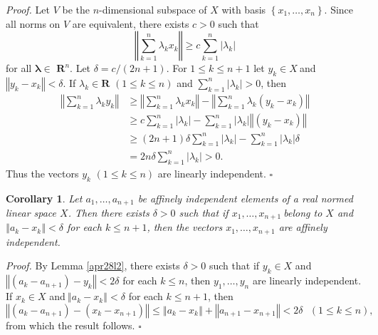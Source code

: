 \documentclass[11pt]{article}%
\newtheorem{corollary}[theorem]{Corollary}
\newenvironment{proof}[1][Proof]{\noindent\textit{#1.} }{}
\begin{document}
\begin{proof}
Let $V$ be the $n$-dimensional subspace of $X$ with basis $\left\{
x_{1},\ldots,x_{n}\right\}  $. Since all norms on $V$ are equivalent, there
exists $c>0$ such that\label{zz}%
\[
\left\Vert \sum_{k=1}^{n}\lambda_{k}x_{k}\right\Vert \geq c\sum_{k=1}%
^{n}\left\vert \lambda_{k}\right\vert
\]
for all $\mathbf{\lambda}\in$ $\mathbf{R}^{n}$. Let $\delta=c/(2n+1)$. For
$1\leq k\leq n+1$ let $y_{k}\in X\ $and $\left\Vert y_{k}-x_{k}\right\Vert
<\delta$. If $\lambda_{k}\in\mathbf{R}$ $(1\leq k\leq n)$ and $\sum_{k=1}%
^{n}\left\vert \lambda_{k}\right\vert >0$, then%
\begin{align*}
\left\Vert \sum_{k=1}^{n}\lambda_{k}y_{k}\right\Vert  &  \geq\left\Vert
\sum_{k=1}^{n}\lambda_{k}x_{k}\right\Vert -\left\Vert \sum_{k=1}^{n}%
\lambda_{k}(y_{k}-x_{k})\right\Vert \\
&  \geq c\sum_{k=1}^{n}\left\vert \lambda_{k}\right\vert -\sum_{k=1}%
^{n}\left\vert \lambda_{k}\right\vert \left\Vert (y_{k}-x_{k})\right\Vert \\
&  \geq\left(  2n+1\right)  \delta\sum_{k=1}^{n}\left\vert \lambda
_{k}\right\vert -\sum_{k=1}^{n}\left\vert \lambda_{k}\right\vert \delta\\
&  =2n\delta\sum_{k=1}^{n}\left\vert \lambda_{k}\right\vert >0\text{. }%
\end{align*}
Thus the vectors $y_{k}$ $(1\leq k\leq n)$ are linearly independent.%
\hfill
$\square$
\end{proof}

\begin{corollary}
\label{sept04c1}Let $a_{1},\ldots,a_{n+1}$ be affinely independent elements of
a real normed linear space $X$. Then there exists $\delta>0$ such that if
$x_{1},\ldots,x_{n+1}\ $belong to $X$ and $\left\Vert a_{k}-x_{k}\right\Vert
<\delta$ for each $k\leq n+1$, then the vectors $x_{1},\ldots,x_{n+1}$ are
affinely independent.
\end{corollary}

\begin{proof}
By Lemma \ref{apr28l2}, there exists $\delta>0$ such that if $y_{k}\in X$ and
$\left\Vert \left(  a_{k}-a_{n+1}\right)  -y_{k}\right\Vert <2\delta$ for each
$k\leq n$, then $y_{1},\ldots,y_{n}$ are linearly independent. If $x_{k}\in X$
and$\ \left\Vert a_{k}-x_{k}\right\Vert <\delta$ for each $k\leq n+1$, then%
\[
\left\Vert \left(  a_{k}-a_{n+1}\right)  -\left(  x_{k}-x_{n+1}\right)
\right\Vert \leq\left\Vert a_{k}-x_{k}\right\Vert +\left\Vert a_{n+1}%
-x_{n+1}\right\Vert <2\delta\ \ \ (1\leq k\leq n),
\]
from which the result follows.%
\hfill
$\square$
\end{proof}
\end{document}
